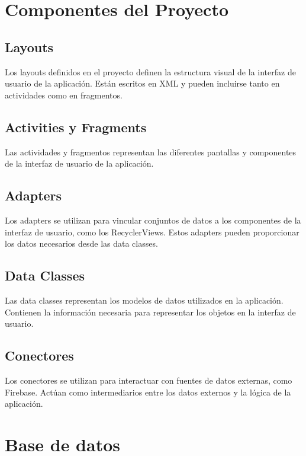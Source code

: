 \documentclass{article}
\begin{document}
\section{Componentes del Proyecto}

    \subsection{Layouts}

    Los layouts definidos en el proyecto definen la estructura visual de la interfaz de usuario de la aplicación. Están escritos en XML y pueden incluirse tanto en actividades como en fragmentos.

    \subsection{Activities y Fragments}

    Las actividades y fragmentos representan las diferentes pantallas y componentes de la interfaz de usuario de la aplicación.

    \subsection{Adapters}

    Los adapters se utilizan para vincular conjuntos de datos a los componentes de la interfaz de usuario, como los RecyclerViews. Estos adapters pueden proporcionar los datos necesarios desde las data classes.

    \subsection{Data Classes}

    Las data classes representan los modelos de datos utilizados en la aplicación. Contienen la información necesaria para representar los objetos en la interfaz de usuario.

    \subsection{Conectores}

    Los conectores se utilizan para interactuar con fuentes de datos externas, como Firebase. Actúan como intermediarios entre los datos externos y la lógica de la aplicación.

\section{Base de datos}
\end{document}
